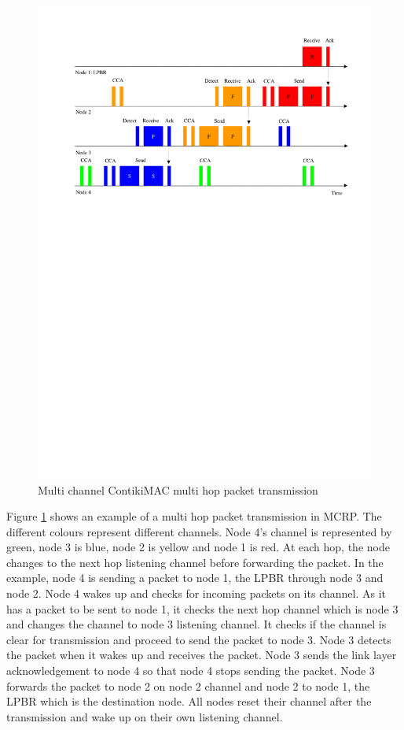 \begin{figure}
\centering
\includegraphics[trim=2cm 17cm 1cm 2cm, clip=true, totalheight=0.35\textheight]{mcrp2.pdf}
\caption{Multi channel ContikiMAC multi hop packet transmission}
\label{fig_mac}
\end{figure}

Figure \ref{fig_mac} shows an example of a multi hop packet transmission in MCRP. The different colours represent different channels. Node 4's channel is represented by green, node 3 is blue, node 2 is yellow and node 1 is red. At each hop, the node changes to the next hop listening channel before forwarding the packet. In the example, node 4 is sending a packet to node 1, the LPBR through node 3 and node 2. Node 4 wakes up and checks for incoming packets on its channel. As it has a packet to be sent to node 1, it checks the next hop channel which is node 3 and changes the channel to node 3 listening channel. It checks if the channel is clear for transmission and proceed to send the packet to node 3. Node 3 detects the packet when it wakes up and receives the packet. Node 3 sends the link layer acknowledgement to node 4 so that node 4 stops sending the packet. Node 3 forwards the packet to node 2 on node 2 channel and node 2 to node 1, the LPBR which is the destination node. All nodes reset their channel after the transmission and wake up on their own listening channel. 

